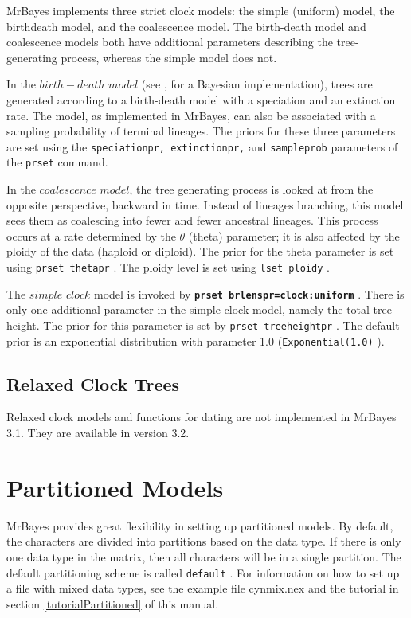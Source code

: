 \documentclass[12pt]{book}
\newcommand{\ttt}[1]{\texttt{#1} }
\newcommand{\tb}[1]{\ttt{\textbf{#1}} }
\begin{document}
MrBayes implements three strict clock models: the simple (uniform) model, the birthdeath model, and
the coalescence model. The birth-death model and coalescence models both have additional parameters
describing the tree-generating process, whereas the simple model does not.

In the $birth-death$ $model$ (see \citet{yang97b}, for a Bayesian implementation), trees are
generated according to a birth-death model with a speciation and an extinction rate. The model, as
implemented in MrBayes, can also be associated with a sampling probability of terminal lineages.
The priors for these three parameters are set using the \ttt{speciationpr, extinctionpr,} and
\ttt{sampleprob} parameters of the \ttt{prset} command.

In the $coalescence$ $model$, the tree generating process is looked at from the opposite
perspective, backward in time. Instead of lineages branching, this model sees them as coalescing
into fewer and fewer ancestral lineages. This process occurs at a rate determined by the $\theta$
(theta) parameter; it is also affected by the ploidy of the data (haploid or diploid). The prior
for the theta parameter is set using \ttt{prset thetapr}.  The ploidy level is set using \ttt{lset
ploidy}.

The $simple$ $clock$ model is invoked by \tb{prset brlenspr=clock:uniform}. There is only one
additional parameter in the simple clock model, namely the total tree height.  The prior for this
parameter is set by \ttt{prset treeheightpr}. The default prior is an exponential distribution with
parameter 1.0 (\ttt{Exponential(1.0)}).

\subsection{Relaxed Clock Trees}
Relaxed clock models and functions for dating are not implemented in MrBayes 3.1. They are
available in version 3.2.

\section{Partitioned Models}
\label{partitionedModels}
MrBayes provides great flexibility in setting up partitioned models. By default, the characters are
divided into partitions based on the data type. If there is only one data type in the matrix, then
all characters will be in a single partition. The default partitioning scheme is called
\ttt{default}. For information on how to set up a file with mixed data types, see the example file
cynmix.nex and the tutorial in section \ref{tutorialPartitioned} of this manual.
\end{document}
